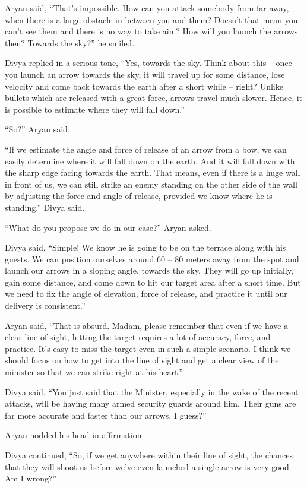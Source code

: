 Aryan said, “That's impossible. How can you attack somebody from far away, when
there is a large obstacle in between you and them? Doesn't that mean you can't
see them and there is no way to take aim? How will you launch the arrows then?
Towards the sky?” he smiled.

Divya replied in a serious tone, “Yes, towards the sky. Think about this – once
you launch an arrow towards the sky, it will travel up for some distance, lose
velocity and come back towards the earth after a short while – right? Unlike
bullets which are released with a great force, arrows travel much slower. Hence,
it is possible to estimate where they will fall down.”

“So?” Aryan said.

“If we estimate the angle and force of release of an arrow from a bow, we can
easily determine where it will fall down on the earth. And it will fall down
with the sharp edge facing towards the earth. That means, even if there is a
huge wall in front of us, we can still strike an enemy standing on the other
side of the wall by adjusting the force and angle of release, provided we know
where he is standing.” Divya said.

“What do you propose we do in our case?” Aryan asked.

Divya said, “Simple! We know he is going to be on the terrace along with his
guests. We can position ourselves around 60 – 80 meters away from the spot and
launch our arrows in a sloping angle, towards the sky. They will go up
initially, gain some distance, and come down to hit our target area after a
short time. But we need to fix the angle of elevation, force of release, and
practice it until our delivery is consistent.”

Aryan said, “That is absurd. Madam, please remember that even if we have a clear
line of sight, hitting the target requires a lot of accuracy, force, and
practice. It's easy to miss the target even in such a simple scenario. I think
we should focus on how to get into the line of sight and get a clear view of the
minister so that we can strike right at his heart.”

Divya said, “You just said that the Minister, especially in the wake of the
recent attacks, will be having many armed security guards around him. Their guns
are far more accurate and faster than our arrows, I guess?”

Aryan nodded his head in affirmation.

Divya continued, “So, if we get anywhere within their line of sight, the chances
that they will shoot us before we've even launched a single arrow is very good.
Am I wrong?”

